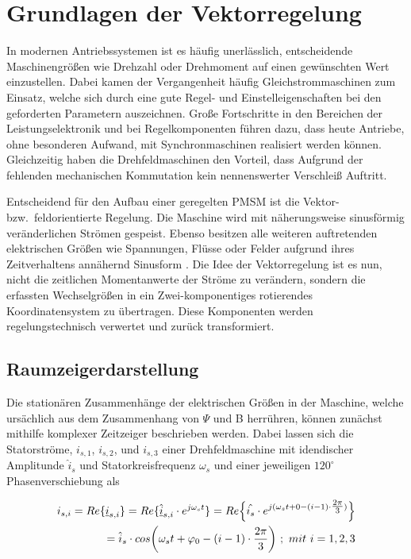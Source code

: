 
\chapter{Grundlagen der Vektorregelung}
\label{cha:Grundlagen der Vektorregelung}

In modernen Antriebssystemen ist es häufig unerlässlich, entscheidende Maschinengrößen wie Drehzahl oder Drehmoment auf einen gewünschten Wert einzustellen.
Dabei kamen der Vergangenheit häufig Gleichstrommaschinen zum Einsatz, welche sich durch eine gute Regel- und Einstelleigenschaften bei den geforderten Parametern auszeichnen.
Große Fortschritte in den Bereichen der Leistungselektronik und bei Regelkomponenten führen dazu, dass heute Antriebe, ohne besonderen Aufwand, mit Synchronmaschinen realisiert werden können.
Gleichzeitig haben die Drehfeldmaschinen den Vorteil, dass Aufgrund der fehlenden mechanischen Kommutation kein nennenswerter Verschleiß Auftritt.

Entscheidend für den Aufbau einer geregelten PMSM ist die Vektor- bzw.\ feldorientierte Regelung. 
Die Maschine wird mit näherungsweise sinusförmig veränderlichen Strömen gespeist. 
Ebenso besitzen alle weiteren auftretenden elektrischen Größen wie Spannungen, Flüsse oder Felder aufgrund ihres Zeitverhaltens annähernd Sinusform \parencite[S.~1]{nuss2010}.	
Die Idee der Vektorregelung ist es nun, nicht die zeitlichen Momentanwerte der Ströme zu verändern, sondern die erfassten Wechselgrößen in ein Zwei-komponentiges rotierendes Koordinatensystem zu übertragen.
Diese Komponenten werden regelungstechnisch verwertet und zurück transformiert.

\section{Raumzeigerdarstellung}
\label{sec:raumzeiger}

Die stationären Zusammenhänge der elektrischen Größen in der Maschine, welche ursächlich aus dem Zusammenhang von $\Psi$ und B herrühren, können zunächst mithilfe komplexer Zeitzeiger beschrieben werden. Dabei lassen sich die Statorströme, $i_{s,1}$, $i_{s,2}$, und $i_{s,3}$ einer Drehfeldmaschine mit idendischer Amplitunde $\hat i_{s}$ und Statorkreisfrequenz $\omega_{s}$  und einer jeweiligen $120^\circ$ Phasenverschiebung als

\begin{align}
	\begin{split}
	i_{s,i} = Re\{\underline{i}_{s,i}\} = Re\{\underline{\hat i}_{s,i}\cdot e^{j\omega_{s}t}\} = Re\Bigl\{\hat{i_{s}}\cdot e^{j(\omega_{s}t+0-(i-1)\cdot\tfrac{2\pi}{3})}\Bigr\}
	\\= \hat{i}_{s}\cdot cos\bigg(\omega_{s}t+\varphi_{0}-(i-1)\cdot\frac{2\pi}{3}\bigg)~;~mit~i=1,2,3 \label{statorströme} 
\end{split}
\end{align}

